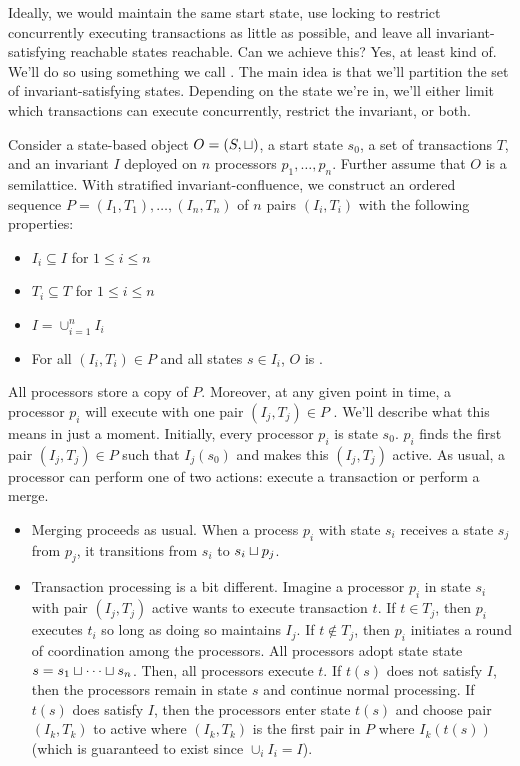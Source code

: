 Ideally, we would maintain the same start state, use locking to restrict
concurrently executing transactions as little as possible, and leave all
invariant-satisfying reachable states reachable. Can we achieve this?  Yes, at
least kind of. We'll do so using something we call . The main idea is that we'll partition the set of
invariant-satisfying states. Depending on the state we're in, we'll either
limit which transactions can execute concurrently, restrict the invariant, or
both.

Consider a state-based object $O = (S, \sqcup)$, a start state $s_0$, a set of
transactions $T$, and an invariant $I$ deployed on $n$ processors $p_1, \ldots,
p_n$. Further assume that $O$ is a semilattice.
%
With stratified invariant-confluence, we construct an ordered sequence $P =
(I_1, T_1), \ldots, (I_n, T_n)$ of $n$ pairs $(I_i, T_i)$ with the following
properties:
\begin{itemize}
  \item
    $I_i \subseteq I$ for $1 \leq i \leq n$

  \item
    $T_i \subseteq T$ for $1 \leq i \leq n$

  \item
    $I = \cup_{i=1}^n I_i$

  \item
    For all $(I_i, T_i) \in P$ and all states $s \in I_i$, $O$ is
    .
\end{itemize}
All processors store a copy of $P$. Moreover, at any given point in time, a
processor $p_i$ will execute with one pair $(I_j, T_j) \in P$ .
We'll describe what this means in just a moment. Initially, every processor
$p_i$ is state $s_0$. $p_i$ finds the first pair $(I_j, T_j) \in P$ such that
$I_j(s_0)$ and makes this $(I_j, T_j)$ active. As usual, a processor can
perform one of two actions: execute a transaction or perform a merge.
\begin{itemize}
  \item
    Merging proceeds as usual. When a process $p_i$ with state $s_i$ receives a
    state $s_j$ from $p_j$, it transitions from $s_i$ to $s_i \sqcup p_j$.

  \item
    Transaction processing is a bit different. Imagine a processor $p_i$ in
    state $s_i$ with pair $(I_j, T_j)$ active wants to execute transaction $t$.
    If $t \in T_j$, then $p_i$ executes $t_i$ so long as doing so maintains
    $I_j$.
    If $t \notin T_j$, then $p_i$ initiates a round of coordination among the
    processors. All processors adopt state state $s = s_1 \sqcup \cdots \sqcup
    s_n$. Then, all processors execute $t$. If $t(s)$ does not satisfy $I$,
    then the processors remain in state $s$ and continue normal processing.  If
    $t(s)$ does satisfy $I$, then the processors enter state $t(s)$ and choose
    pair $(I_k, T_k)$ to active where $(I_k, T_k)$ is the first pair in $P$
    where $I_k(t(s))$ (which is guaranteed to exist since $\cup_i I_i = I$).
\end{itemize}

